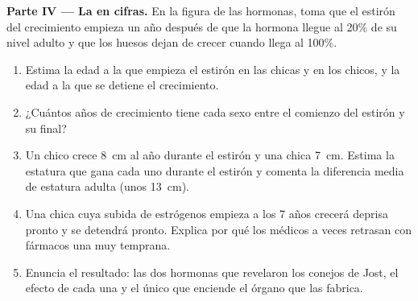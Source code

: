 \begin{problem}
\medskip
\noindent\textbf{Parte IV --- La  en cifras.}
En la figura de las hormonas, toma que el estirón del crecimiento
empieza un año después de que la hormona llegue al 20\% de su nivel
adulto y que los huesos dejan de crecer cuando llega al 100\%.
\begin{enumerate}[resume]
  \item Estima la edad a la que empieza el estirón en las chicas y en
        los chicos, y la edad a la que se detiene el crecimiento.
  \item ¿Cuántos años de crecimiento tiene cada sexo entre el comienzo
        del estirón y su final?
  \item Un chico crece \qty{8}{cm} al año durante el estirón y una
        chica \qty{7}{cm}. Estima la estatura que gana cada uno durante
        el estirón y comenta la diferencia media de estatura adulta
        (unos \qty{13}{cm}).
  \item Una chica cuya subida de estrógenos empieza a los 7 años
        crecerá deprisa pronto y se detendrá pronto. Explica por qué
        los médicos a veces retrasan con fármacos una  muy
        temprana.
  \item Enuncia el resultado: las dos hormonas que revelaron los
        conejos de Jost, el efecto de cada una y el único  que
        enciende el órgano que las fabrica.
\end{enumerate}
\end{problem}
